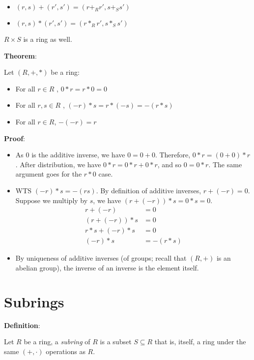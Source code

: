 \documentclass{article}
\begin{document}
\begin{multicols*}{2}
\begin{itemize}
    \item $(r, s) + (r', s') = (r +_R r', s +_S s')$
    \item$(r, s) * (r', s') = (r *_R r', s *_S s')$
\end{itemize}

$R \times S$ is a ring as well.

\textbf{Theorem}:

Let $(R, +, *)$ be a ring:

\begin{itemize}
    \item[(1)] For all $r \in R$ , $0 * r = r * 0 = 0$
    \item[(2)] For all $r, s \in R$ , $(-r)*s = r*(-s) = -(r*s)$
    \item[(3)] For all $r \in R$, $-(-r) = r$
\end{itemize}

\textbf{Proof}:

\begin{itemize}
    \item[(1)] As $0$ is the additive inverse, we have $0 = 0 + 0$. Therefore, $0*r = (0 + 0)*r$. After distribution, we have $0*r = 0*r + 0*r$, and so $0 = 0*r$. The same argument goes for the $r * 0$ case.
    \item[(2)] WTS $(-r)*s = -(rs)$. By definition of additive inverses, $r + (-r) = 0$. Suppose we multiply by $s$, we have $(r + (-r))*s = 0 *s = 0$.\[\begin{aligned}
        r + (-r) &= 0\\
        (r + (-r)) * s &= 0\\
        r*s + (-r) * s &= 0\\
        (-r) * s &= -(r*s)
    \end{aligned}\]
    \item[(3)] By uniqueness of additive inverses (of groups; recall that $(R,+)$ is an abelian group), the inverse of an inverse is the element itself.
\end{itemize}

\section{Subrings}

\textbf{Definition}:

Let $R$ be a ring, a \textit{subring} of $R$ is a subset $S \subseteq R$ that is, itself, a ring under the same $(+, \cdot)$ operations as $R$.


\end{multicols*}
\end{document}
